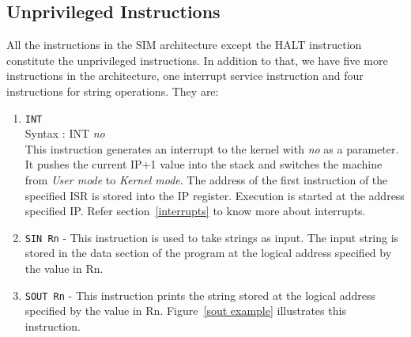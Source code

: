 \subsection{Unprivileged Instructions}
\label{sec:unprvlgd}
All the instructions in the SIM architecture except the HALT instruction constitute the unprivileged instructions. In addition to that, we have five more instructions in the \ESIM architecture, one interrupt service instruction and four instructions for string operations. They are:
\begin{enumerate}
	\item \texttt{INT} \\ Syntax : INT \emph{no} \\
	This instruction generates an interrupt to the kernel with \emph{no} as a parameter. It pushes the current IP+1 value into the stack and switches the machine from \textit{User mode} to \textit{Kernel mode}. The address of the first instruction of the specified ISR is stored into the IP register. Execution is started at the address specified IP. Refer section~\ref{interrupts} to know more about interrupts.
	
	\item \texttt{SIN Rn} - This instruction is used to take strings as input. The input string is stored in the data section of the program at the logical address specified by the value in Rn.
	
	\item \texttt{SOUT Rn} - This instruction prints the string stored at the logical address specified by the value in Rn. Figure~\ref{sout example} illustrates this instruction.


\end{enumerate}
